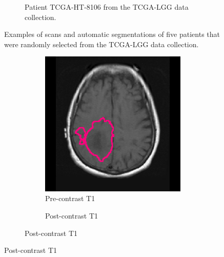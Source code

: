 \begin{subappendices}
\begin{figure}[htbp]
\begin{subfigure}[b]{0.95\textwidth}
\begin{subfigure}[b]{0.215\textwidth}
        \end{subfigure}
        \caption{Patient TCGA-HT-8106 from the TCGA-LGG data collection.}
    \end{subfigure}
    \caption{Examples of scans and automatic segmentations of five patients that were randomly selected from the TCGA-LGG data collection.}\label{fig:seg_examples_LGG}
\end{figure}


\begin{figure}[htbp]
    \centering
    \begin{subfigure}[b]{0.95\textwidth}
        \centering
        \hfill
        \begin{subfigure}[b]{0.215\textwidth}
        \caption*{Pre-contrast \acrshort{T1}}
        \includegraphics[width=\textwidth, clip, trim=2.5cm 0.5cm 2.5cm 0.5cm]{Figures/Random_segs/T1_TCGA-02-0037.png}
        \end{subfigure}
        \hfill
        \begin{subfigure}[b]{0.215\textwidth}
        \caption*{Post-contrast \acrshort{T1}}

\end{subfigure}
\end{subfigure}
\end{figure}
\end{subappendices}
